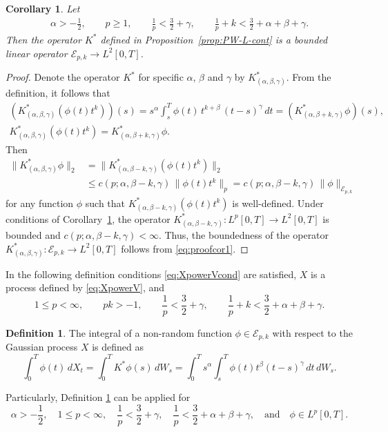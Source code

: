 \documentclass{article}
\theoremstyle{plain}
\newtheorem{corollary}{Corollary}
\theoremstyle{remark}
\theoremstyle{definition}
\newtheorem{definition}{Definition}
\begin{document}
\begin{corollary}
	\label{corollary:ELbound}
	Let
	\begin{gather*}
		\alpha>-\frac12,
		\qquad
		p\ge 1,
		\qquad
		\frac{1}{p} < \frac32+\gamma, \qquad
		\frac{1}{p} + k < \frac32 + \alpha+\beta+\gamma .
	\end{gather*}
	Then the operator $K^*$ defined in Proposition~\ref{prop:PW-L-cont}
	is a bounded linear operator $\mathcal{E}_{p,k}\to  L^2[0,T]$.
\end{corollary}
\begin{proof}
Denote
the operator $K^*$ for specific $\alpha$, $\beta$ and
$\gamma$ by $K^*_{(\alpha,\beta,\gamma)}$.
From the definition, it follows that
\begin{gather*}
(K^*_{(\alpha,\beta,\gamma)}
(\phi(t) t^k))  (s) =
s^\alpha \int_s^T \! \phi(t) \, t^{k+\beta} \, (t-s)^\gamma\, dt
=(K^*_{(\alpha,\beta+k,\gamma)} \phi) (s), \\
K^*_{(\alpha,\beta,\gamma)}
(\phi(t) t^k) = K^*_{(\alpha,\beta+k,\gamma)} \phi .
\end{gather*}
Then
\begin{align}
\|K^*_{(\alpha,\beta,\gamma)} \phi\|_2
&=
\|K^*_{(\alpha,\beta-k,\gamma)} (\phi(t) t^k)\|_2
\nonumber \\ &\le
c(p; \alpha, \beta{-}k, \gamma) \, \|\phi(t) t^k\|_p
=
c(p; \alpha, \beta{-}k, \gamma) \, \|\phi\|_{\mathcal{E}_{p,k}}
\label{eq:proofcor1}
\end{align}
for any function $\phi$ such that
$K^*_{(\alpha,\beta-k,\gamma)} (\phi(t) t^k)$ is well-defined.
Under conditions of Corollary~\ref{corollary:ELbound},
the operator
$K^*_{(\alpha,\beta-k,\gamma)} : L^p[0,T] \to L^2[0,T]$
is bounded and $c(p; \alpha, \beta{-}k, \gamma) < \infty$.
Thus,
the boundedness of the operator
$K^*_{(\alpha,\beta,\gamma)} : \mathcal{E}_{p,k} \to L^2[0,T]$
follows from \eqref{eq:proofcor1}.
\end{proof}

In the following definition conditions \eqref{eq:XpowerVcond}
	are satisfied, $X$ is a process
	defined by \eqref{eq:XpowerV}, and
\[
	1 \le  p < \infty, \qquad
	p k > -1, \qquad
	\frac{1}{p} < \frac32 +\gamma, \qquad
	\frac{1}{p} + k < \frac32 + \alpha+\beta+\gamma .
\]
\begin{definition}\label{def-PLI-3p}
	The integral of a non-random function
	$\phi\in\mathcal{E}_{p,k}$
	with respect to the Gaussian process $X$
	is defined as
	\begin{equation}\label{eq:def-PLI-3p}
		\int_0^T \phi(t) \, dX_t
		= \int_0^T K^* \phi(s) \, dW_s
		= \int_0^T s^\alpha
		\int_s^T \phi(t) t^\beta (t-s)^\gamma \, dt
		\, dW_s.
	\end{equation}
\end{definition}
Particularly, Definition \ref{def-PLI-3p} can be applied for
\[
	\alpha>-\frac12,
	\quad
	1 \le p < \infty,
	\quad
	\frac{1}{p} < \frac32+\gamma, \quad
	\frac{1}{p} < \frac32 + \alpha+\beta+\gamma,
	\quad \mbox{and} \quad
	\phi \in L^p[0,T].
\]
\end{document}
